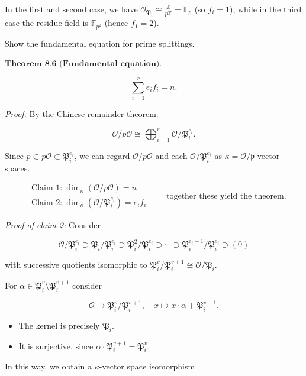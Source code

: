 In the first and second case, we have \( \mathcal{O}_{\mathfrak{P}_i} \cong \frac{\mathbb{Z}}{p\mathbb{Z}} = \mathbb{F}_p \) (so \( f_i = 1 \)), while in the third case the residue field is \(\mathbb{F}_{p^2}\) (hence \( f_1 = 2 \)).


Show the fundamental equation for prime splittings.

\( \textbf{Theorem 8.6 (Fundamental equation).} \)

\[
\sum_{i=1}^r e_i f_i = n.
\]

\textit{Proof.} By the Chinese remainder theorem:

\[
\mathcal{O}/p\mathcal{O} \cong \bigoplus_{i=1}^r \mathcal{O}/\mathfrak{P}_i^{e_i}.
\]

Since \( p \subset p\mathcal{O} \subset \mathfrak{P}_i^{e_i} \), we can regard \(\mathcal{O}/p\mathcal{O}\) and each \(\mathcal{O}/\mathfrak{P}_i^{e_i}\) as \(\kappa = \mathcal{O}/\mathfrak{p}\)-vector spaces.

\[
\begin{aligned}
    & \text{Claim 1:} \ \dim_\kappa \left( \mathcal{O}/p\mathcal{O} \right) = n \\
    & \text{Claim 2:} \ \dim_\kappa \left( \mathcal{O}/\mathfrak{P}_i^{e_i} \right) = e_i f_i
\end{aligned}
\qquad
\text{together these yield the theorem.}
\]

\textit{Proof of claim 2:} Consider

\[
\mathcal{O}/\mathfrak{P}_i^{e_i} \supset \mathfrak{P}_i/\mathfrak{P}_i^{e_i} \supset \mathfrak{P}_i^2/\mathfrak{P}_i^{e_i} \supset \cdots \supset \mathfrak{P}_i^{e_i-1}/\mathfrak{P}_i^{e_i} \supset (0)
\]

with successive quotients isomorphic to \(\mathfrak{P}_i^v/\mathfrak{P}_i^{v+1} \cong \mathcal{O}/\mathfrak{P}_i\).

For \(\alpha \in \mathfrak{P}_i^v \setminus \mathfrak{P}_i^{v+1}\) consider

\[
\mathcal{O} \to \mathfrak{P}_i^v/\mathfrak{P}_i^{v+1}, \quad x \mapsto x \cdot \alpha + \mathfrak{P}_i^{v+1}.
\]

\begin{itemize}
    \item The kernel is precisely \(\mathfrak{P}_i\).
    \item It is surjective, since \(\alpha \cdot \mathfrak{P}_i^{v+1} = \mathfrak{P}_i^v\).
\end{itemize}
In this way, we obtain a \(\kappa\)-vector space isomorphism

